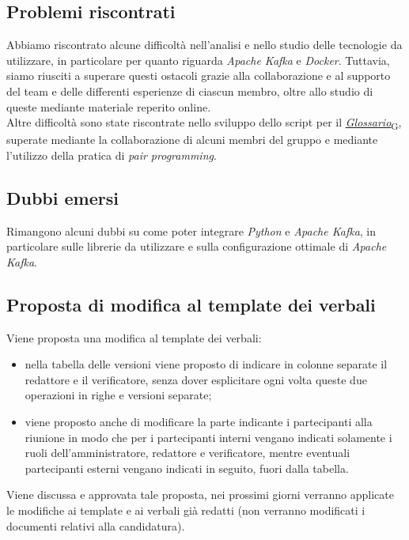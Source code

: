 \documentclass[italian,12pt]{article}
\begin{document}
\subsection{Problemi riscontrati}
Abbiamo riscontrato alcune difficoltà nell'analisi e nello studio delle tecnologie da utilizzare, in particolare per quanto riguarda \textit{Apache Kafka} e \textit{Docker}. Tuttavia, siamo riusciti a superare questi ostacoli grazie alla collaborazione e al supporto del team e delle differenti esperienze di ciascun membro, oltre allo studio di queste mediante materiale reperito online. \\
Altre difficoltà sono state riscontrate nello sviluppo dello script per il \href{https://7last.github.io/docs/rtb/documentazione-interna/glossario#glossario}{\textit{Glossario}\textsubscript{G}}, superate mediante la collaborazione di alcuni membri del gruppo e mediante l'utilizzo della pratica di \textit{pair programming}.

\subsection{Dubbi emersi}
Rimangono alcuni dubbi su come poter integrare \textit{Python} e \textit{Apache Kafka}, in particolare sulle librerie da utilizzare e sulla configurazione ottimale di \textit{Apache Kafka}.

\subsection{Proposta di modifica al template dei verbali}
Viene proposta una modifica al template dei verbali:
\begin{itemize}
	\item nella tabella delle versioni viene proposto di indicare in colonne separate il redattore e il verificatore, senza dover esplicitare ogni volta queste due operazioni in righe e versioni separate;
	\item viene proposto anche di modificare la parte indicante i partecipanti alla riunione in modo che per i partecipanti interni vengano indicati solamente i ruoli dell'amministratore, redattore e verificatore, mentre eventuali partecipanti esterni vengano indicati in seguito, fuori dalla tabella.
\end{itemize}
Viene discussa e approvata tale proposta, nei prossimi giorni verranno applicate le modifiche ai template e ai verbali già redatti (non verranno modificati i documenti relativi alla candidatura).
\end{document}
